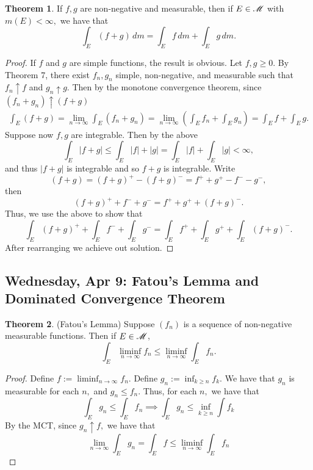 \documentclass[10pt, oneside]{article}
\theoremstyle{definition}
\newtheorem{thm}{Theorem}
\begin{document}
\begin{thm}
    If $f,g$ are non-negative and measurable, then if $E\in \cal M$ with $m(E) < \infty,$ we have that
    \[\int_E (f + g)\, dm = \int_E f \, dm  + \int_E g\, dm.\] 
\end{thm}
\begin{proof}
    If $f$ and $g$ are simple functions, the result is obvious. Let $f, g \geq 0.$ By Theorem 7, there exist $f_n, g_n$ simple, non-negative, and measurable such that $f_n \uparrow f$ and $g_n \uparrow g.$ Then by the monotone convergence theorem, since $(f_n + g_n) \uparrow (f + g)$
    \begin{align*}
        \int_{E}(f  + g) = \lim_{n\to \infty} \int_E (f_n + g_n) = \lim_{n\to \infty} (\int_E f_n +\int_E g_n) = \int_E f + \int_E g.  
    \end{align*}
    Suppose now $f,g$ are integrable. Then by the above
    \[\int_E |f + g|  \leq \int_E |f| + |g|  = \int_E |f| + \int_E |g| < \infty,\] and thus $|f+ g|$ is integrable and so $f + g$ is integrable. Write 
    \[(f + g) = (f + g)^+ - (f + g)^- = f^+ + g^+ - f^- - g^-,\] then 
    \[(f + g)^+ + f^- + g^- = f^+ + g^+ + (f + g)^-.\] Thus, we use the above to show that 
    \[\int_E(f + g)^+ + \int_Ef^- + \int_Eg^- = \int_Ef^+ + \int_Eg^+ + \int_E(f + g)^-.\] After rearranging we achieve out solution.
 \end{proof}

 \newpage
 \subsection{Wednesday, Apr 9: Fatou's Lemma and Dominated Convergence Theorem}
 \begin{thm}
 (Fatou's Lemma)
     Suppose $(f_n)$ is a sequence of non-negative measurable functions. Then if $E \in \cal M$,
     \[\int_E \liminf_{n\to \infty} f_n \leq \liminf_{n\to \infty} \int_E f_n.\]
 \end{thm}
 \begin{proof}
 Define $f := \displaystyle\liminf_{n\to \infty}f_n.$
Define $g_n := \inf_{k\geq n}f_k.$ We have that $g_n$ is measurable for each $n,$ and $g_n \leq f_n.$ Thus, for each $n,$ we have that
     \[\int_E g_n \leq \int_E f_n \implies \int_Eg_n \leq \inf_{k \geq n}\int f_k\]
     By the MCT, since $g_n \uparrow f,$ we have that
     \[\lim_{n\to \infty} \int_E g_n =\int_E f \leq \liminf_{n \to \infty}\int_E f_n \]
 \end{proof}
\end{document}

